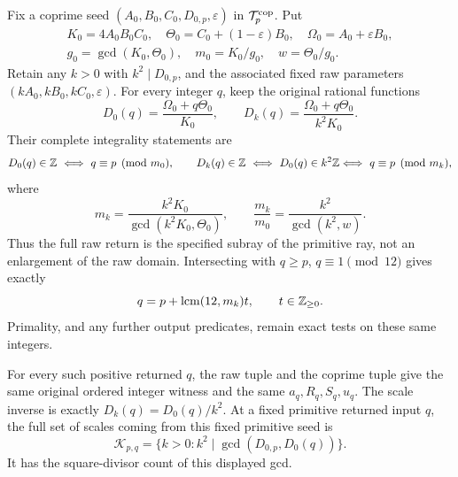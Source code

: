 \begin{theorem}
\label{thm:raw-scale-period}
Fix a coprime seed \((A_0,B_0,C_0,D_{0,p},\varepsilon)\)
in \(\mathcal T_p^{\rm cop}\).  Put
\[
 \begin{gathered}
 K_0=4A_0B_0C_0,\quad
 \Theta_0=C_0+(1-\varepsilon)B_0,\quad
 \Omega_0=A_0+\varepsilon B_0,\\
 g_0=\gcd(K_0,\Theta_0),\quad m_0=K_0/g_0,\quad w=\Theta_0/g_0.
 \end{gathered}
\]
Retain any \(k>0\) with \(k^2\mid D_{0,p}\), and the associated
fixed raw parameters \((kA_0,kB_0,kC_0,\varepsilon)\).
For every integer \(q\), keep the original rational functions
\[
 D_0(q)=\frac{\Omega_0+q\Theta_0}{K_0},\qquad
 D_k(q)=\frac{\Omega_0+q\Theta_0}{k^2K_0}.
\]
Their complete integrality statements are
\[
 D_0(q)\in\mathbb Z\ \Longleftrightarrow\ q\equiv p\pmod{m_0},
 \qquad
 D_k(q)\in\mathbb Z\ \Longleftrightarrow\ D_0(q)\in k^2\mathbb Z
 \Longleftrightarrow\ q\equiv p\pmod{m_k},
\]
where
\begin{equation}\label{eq:raw-scale-period}
 m_k=\frac{k^2K_0}{\gcd(k^2K_0,\Theta_0)},\qquad
 \frac{m_k}{m_0}=\frac{k^2}{\gcd(k^2,w)}.
\end{equation}
Thus the full raw return is the specified subray of the primitive
ray, not an enlargement of the raw domain.  Intersecting with
\(q\ge p\), \(q\equiv1\pmod{12}\) gives exactly
\[
 q=p+\operatorname{lcm}(12,m_k)t,\qquad t\in\mathbb Z_{\ge0}.
\]
Primality, and any further output predicates, remain exact tests on
these same integers.

For every such positive returned \(q\), the raw tuple and the
coprime tuple give the same original ordered integer witness and
the same \(a_q,R_q,S_q,u_q\).  The scale inverse is exactly
\(D_k(q)=D_0(q)/k^2\).  At a fixed primitive returned input \(q\),
the full set of scales coming from this fixed primitive seed is
\[
 \mathcal K_{p,q}=
 \{k>0:k^2\mid\gcd(D_{0,p},D_0(q))\}.
\]
It has the square-divisor count of this displayed gcd.
\end{theorem}
